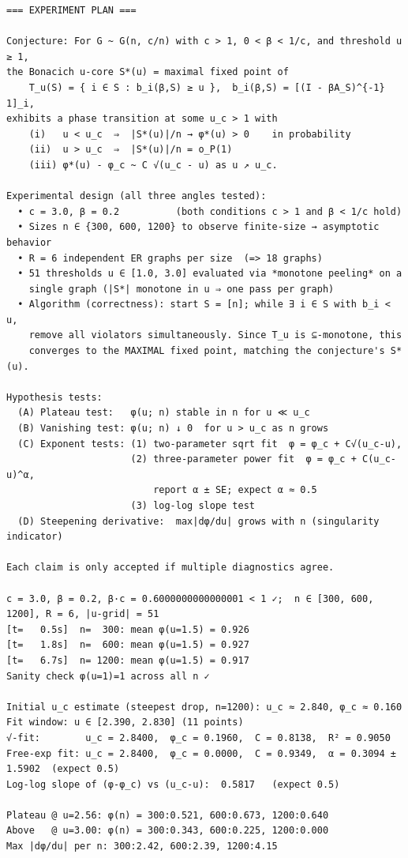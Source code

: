\documentclass[11pt]{article}
\begin{document}
\begin{lstlisting}
=== EXPERIMENT PLAN ===

Conjecture: For G ~ G(n, c/n) with c > 1, 0 < β < 1/c, and threshold u ≥ 1,
the Bonacich u-core S*(u) = maximal fixed point of
    T_u(S) = { i ∈ S : b_i(β,S) ≥ u },  b_i(β,S) = [(I - βA_S)^{-1} 1]_i,
exhibits a phase transition at some u_c > 1 with
    (i)   u < u_c  ⇒  |S*(u)|/n → φ*(u) > 0    in probability
    (ii)  u > u_c  ⇒  |S*(u)|/n = o_P(1)
    (iii) φ*(u) - φ_c ~ C √(u_c - u) as u ↗ u_c.

Experimental design (all three angles tested):
  • c = 3.0, β = 0.2          (both conditions c > 1 and β < 1/c hold)
  • Sizes n ∈ {300, 600, 1200} to observe finite-size → asymptotic behavior
  • R = 6 independent ER graphs per size  (=> 18 graphs)
  • 51 thresholds u ∈ [1.0, 3.0] evaluated via *monotone peeling* on a
    single graph (|S*| monotone in u ⇒ one pass per graph)
  • Algorithm (correctness): start S = [n]; while ∃ i ∈ S with b_i < u,
    remove all violators simultaneously. Since T_u is ⊆-monotone, this
    converges to the MAXIMAL fixed point, matching the conjecture's S*(u).

Hypothesis tests:
  (A) Plateau test:   φ(u; n) stable in n for u ≪ u_c
  (B) Vanishing test: φ(u; n) ↓ 0  for u > u_c as n grows
  (C) Exponent tests: (1) two-parameter sqrt fit  φ = φ_c + C√(u_c-u),
                      (2) three-parameter power fit  φ = φ_c + C(u_c-u)^α,
                          report α ± SE; expect α ≈ 0.5
                      (3) log-log slope test
  (D) Steepening derivative:  max|dφ/du| grows with n (singularity indicator)

Each claim is only accepted if multiple diagnostics agree.

c = 3.0, β = 0.2, β·c = 0.6000000000000001 < 1 ✓;  n ∈ [300, 600, 1200], R = 6, |u-grid| = 51
[t=   0.5s]  n=  300: mean φ(u=1.5) = 0.926
[t=   1.8s]  n=  600: mean φ(u=1.5) = 0.927
[t=   6.7s]  n= 1200: mean φ(u=1.5) = 0.917
Sanity check φ(u=1)=1 across all n ✓

Initial u_c estimate (steepest drop, n=1200): u_c ≈ 2.840, φ_c ≈ 0.160
Fit window: u ∈ [2.390, 2.830] (11 points)
√-fit:        u_c = 2.8400,  φ_c = 0.1960,  C = 0.8138,  R² = 0.9050
Free-exp fit: u_c = 2.8400,  φ_c = 0.0000,  C = 0.9349,  α = 0.3094 ± 1.5902  (expect 0.5)
Log-log slope of (φ-φ_c) vs (u_c-u):  0.5817   (expect 0.5)

Plateau @ u=2.56: φ(n) = 300:0.521, 600:0.673, 1200:0.640
Above   @ u=3.00: φ(n) = 300:0.343, 600:0.225, 1200:0.000
Max |dφ/du| per n: 300:2.42, 600:2.39, 1200:4.15


\end{lstlisting}
\end{document}
